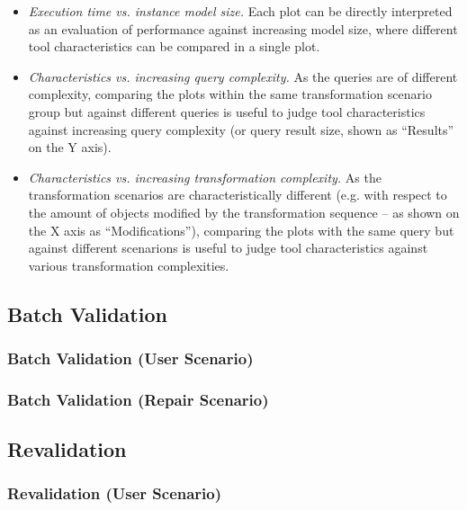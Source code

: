 \begin{itemize}
  \item \emph{Execution time vs. instance model size.} Each plot can be directly interpreted as an evaluation of performance against increasing model size, where different tool characteristics can be compared in a single plot.
  \item \emph{Characteristics vs. increasing query complexity.} As the queries are of different complexity, comparing the plots within the same transformation scenario group but against different queries is useful to judge tool characteristics against increasing query complexity (or query result size, shown as ``Results'' on the Y axis).
  \item \emph{Characteristics vs. increasing transformation complexity.} As the transformation scenarios are characteristically different (e.g. with respect to the amount of objects modified by the transformation sequence -- as shown on the X axis as ``Modifications''), comparing the plots with the same query but against different scenarions is useful to judge tool characteristics against various transformation complexities.
\end{itemize}



\subsection{Batch Validation}
\label{sec:results:batchvalidation}
\subsubsection{Batch Validation (User Scenario)}
\subsubsection{Batch Validation (Repair Scenario)}

\subsection{Revalidation}
\label{sec:results:revalidation}
\subsubsection{Revalidation (User Scenario)}
